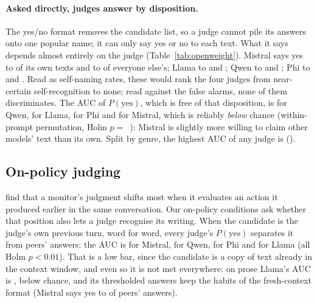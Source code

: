 \paragraph{Asked directly, judges answer by disposition.} The yes/no format
removes the candidate list, so a judge cannot pile its answers onto one
popular name; it can only say yes or no to each text. What it says depends
almost entirely on the judge (Table~\ref{tab:openweight}). Mistral says yes
to \OWMistralBinaryHit{} of its own texts and to \OWMistralBinaryFA{} of
everyone else's; Llama to \OWLlamaBinaryHit{} and \OWLlamaBinaryFA{}; Qwen
to \OWQwenBinaryHit{} and \OWQwenBinaryFA{}; Phi to \OWPhiBinaryHit{} and
\OWPhiBinaryFA{}. Read as self-naming rates, these would rank the four judges
from near-certain self-recognition to none; read against the false alarms,
none of them discriminates. The AUC of $P(\text{yes})$, which is free of that
disposition, is \OWQwenBinaryAUC{} for Qwen, \OWLlamaBinaryAUC{} for Llama,
\OWPhiBinaryAUC{} for Phi and \OWMistralBinaryAUC{} \OWMistralBinaryAUCCI{}
for Mistral, which is reliably \emph{below} chance (within-prompt
permutation, Holm $p=$~\OWMistralBinaryAUCHolm{}): Mistral is slightly more
willing to claim other models' text than its own. Split by genre, the
highest AUC of any judge is \OWBinaryAUCGenreMax{} \OWBinaryAUCGenreMaxCI{}
(\OWBinaryAUCGenreMaxWho{}).

\subsection{On-policy judging}
\label{sec:onpolicy}
\citet{khullar2026selfattribution} find that a monitor's judgment shifts
most when it evaluates an action it produced earlier in the same
conversation. Our on-policy conditions ask whether that position also lets a
judge recognise its writing. When the candidate is the judge's own previous
turn, word for word, every judge's $P(\text{yes})$ separates it from peers'
answers: the AUC is \OWMistralOnPolAUC{} for Mistral, \OWQwenOnPolAUC{} for
Qwen, \OWPhiOnPolAUC{} for Phi and \OWLlamaOnPolAUC{} for Llama (all Holm
$p<0.01$). That is a low bar, since the candidate is a copy of text already in
the context window, and even so it is not met everywhere: on prose Llama's
AUC is \OWLlamaOnPolProseAUC{}, below chance, and its thresholded answers keep
the habits of the fresh-context format (Mistral says yes to
\OWMistralOnPolFA{} of peers' answers). \OnPolResampled{}
